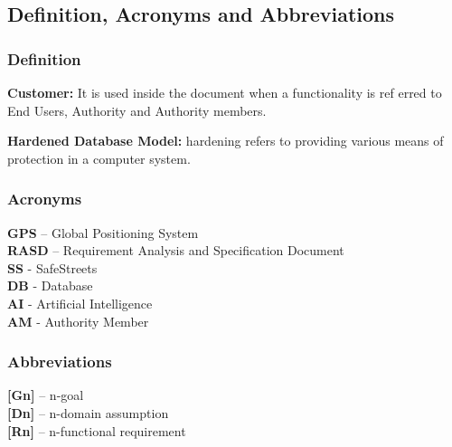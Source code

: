 \documentclass[12pt]{article}
\begin{document}
\subsection{Definition, Acronyms and Abbreviations}
\vspace{5mm}
\subsubsection{Definition}
\vspace{2mm}
\begin{flushleft}

\textbf{Customer:} It is used inside the document when a functionality is ref
erred to End Users, Authority and Authority members.
\vspace{2mm}

\textbf{Hardened Database Model:} hardening refers to providing various means of protection in a computer system. 

\end{flushleft}

\subsubsection{Acronyms}
\vspace{2mm}
\begin{flushleft}

\textbf{GPS} – Global Positioning System
\vspace{2mm}\\

\textbf{RASD} – Requirement Analysis and Specification Document 
\vspace{2mm}\\


\textbf{SS} - SafeStreets
\vspace{2mm}\\


\textbf{DB} - Database
\vspace{2mm}\\


\textbf{AI} - Artificial Intelligence
\vspace{2mm}\\

\textbf{AM} - Authority Member
\end{flushleft}

\newpage

\subsubsection{Abbreviations}
\vspace{2mm}
\begin{flushleft}

\textbf{[Gn]} – n-goal 
\vspace{2mm}\\
\textbf{[Dn]} – n-domain assumption 
\vspace{2mm}\\
\textbf{[Rn]} – n-functional requirement 
\vspace{2mm}\\

\end{flushleft}
\vspace{2mm}
\end{document}
